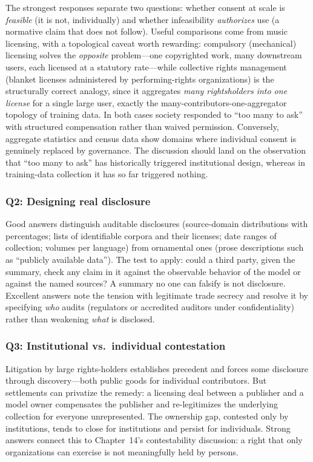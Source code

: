 The strongest responses separate two questions: whether consent at scale is \emph{feasible} (it is not, individually) and whether infeasibility \emph{authorizes} use (a normative claim that does not follow). Useful comparisons come from music licensing, with a topological caveat worth rewarding: compulsory (mechanical) licensing solves the \emph{opposite} problem---one copyrighted work, many downstream users, each licensed at a statutory rate---while collective rights management (blanket licenses administered by performing-rights organizations) is the structurally correct analogy, since it aggregates \emph{many rightsholders into one license} for a single large user, exactly the many-contributors-one-aggregator topology of training data. In both cases society responded to ``too many to ask'' with structured compensation rather than waived permission. Conversely, aggregate statistics and census data show domains where individual consent is genuinely replaced by governance. The discussion should land on the observation that ``too many to ask'' has historically triggered institutional design, whereas in training-data collection it has so far triggered nothing.

\subsubsection*{Q2: Designing real disclosure}

Good answers distinguish auditable disclosures (source-domain distributions with percentages; lists of identifiable corpora and their licenses; date ranges of collection; volumes per language) from ornamental ones (prose descriptions such as ``publicly available data''). The test to apply: could a third party, given the summary, check any claim in it against the observable behavior of the model or against the named sources? A summary no one can falsify is not disclosure. Excellent answers note the tension with legitimate trade secrecy and resolve it by specifying \emph{who} audits (regulators or accredited auditors under confidentiality) rather than weakening \emph{what} is disclosed.

\subsubsection*{Q3: Institutional vs.\ individual contestation}

Litigation by large rights-holders establishes precedent and forces some disclosure through discovery---both public goods for individual contributors. But settlements can privatize the remedy: a licensing deal between a publisher and a model owner compensates the publisher and re-legitimizes the underlying collection for everyone unrepresented. The ownership gap, contested only by institutions, tends to close for institutions and persist for individuals. Strong answers connect this to Chapter~14's contestability discussion: a right that only organizations can exercise is not meaningfully held by persons.

